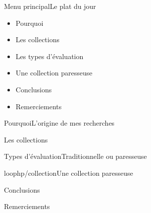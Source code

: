 





\begin{frame}[plain]
	\titlepage{}
\end{frame}

\newcommand\blankfootnote[1]{%
  \let\thefootnote\relax\footnotetext{#1}%
  \let\thefootnote\svthefootnote%
}

\begin{frame}{Menu principal}{Le plat du jour}
    \begin{itemize}
        \item Pourquoi
        \item Les collections
        \item Les types d'évaluation
        \item Une collection paresseuse
        \item Conclusions
        \item Remerciements
    \end{itemize}
\end{frame}

\begin{frameD}{Pourquoi}{L'origine de mes recherches}

\end{frameD}



\begin{frameD}{Les collections}

\end{frameD}



\begin{frameD}{Types d'évaluation}{Traditionnelle ou paresseuse}

\end{frameD}



\begin{frameD}{loophp/collection}{Une collection paresseuse}

\end{frameD}



\begin{frameD}{Conclusions}

\end{frameD}



\begin{frameD}{Remerciements}

\end{frameD}




